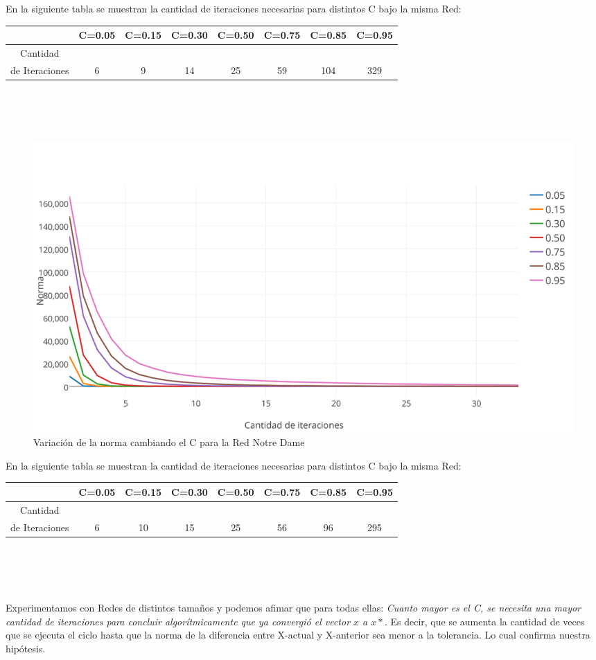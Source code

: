 \documentclass[a4paper]{article}
\begin{document}
En la siguiente tabla se muestran la cantidad de iteraciones necesarias para distintos C bajo la misma Red: \\
 \begin{tabular}[c]{|c|c|c|c|c|c|c|c|}
\hline
 & C=0.05 & C=0.15 & C=0.30 & C=0.50 & C=0.75 & C=0.85 & C=0.95 \\
\hline
Cantidad &  & & & & & & \\ 
de Iteraciones & 6 & 9 & 14 & 25 & 59 & 104 & 329\\
\hline
	\end{tabular}\\\\	
\\	
\begin{figure}[h!]
  \begin{center}
	\includegraphics[scale=0.50]{imagenes/exp12/notredamePAGERANK.png}
	\caption{Variaci\'on de la norma cambiando el C para la Red Notre Dame}
	\label{nombreparareferenciar}
  \end{center}
\end{figure}
En la siguiente tabla se muestran la cantidad de iteraciones necesarias para distintos C bajo la misma Red: \\
 \begin{tabular}[c]{|c|c|c|c|c|c|c|c|}
\hline
 & C=0.05 & C=0.15 & C=0.30 & C=0.50 & C=0.75 & C=0.85 & C=0.95 \\
\hline
Cantidad &  & & & & & & \\ 
de Iteraciones & 6 & 10 & 15 & 25 & 56 & 96 & 295\\
\hline
	\end{tabular}\\\\
\\
\\
\indent Experimentamos con Redes de distintos tama\~nos y podemos afimar que para todas ellas: \emph{Cuanto mayor es el C, se necesita una mayor cantidad de iteraciones para concluir algor\'itmicamente que ya convergi\'o el vector $x$ a $x\ast$}. Es decir, que se aumenta la cantidad de veces que se ejecuta el ciclo hasta que la norma de la diferencia entre X-actual y X-anterior sea menor a la tolerancia. Lo cual confirma nuestra hip\'otesis.
\newpage
\end{document}
